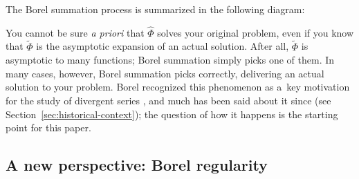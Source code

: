 \documentclass[10pt,a4paper]{amsart}
\newcommand{\series}[1]{\tilde{#1}}
\newcommand{\laplace}{\mathcal{L}}
\newcommand{\borel}{\mathcal{B}}
\newcommand{\aexp}{\text{\rm \ae}}
\numberwithin{equation}{section}
\begin{document}
The Borel summation process is summarized in the following diagram:
\begin{center}
\end{center}

You cannot be sure {\em a priori} that $\hat{\Phi}$ solves your original problem, even if you know that $\series{\Phi}$ is the asymptotic expansion of an actual solution. After all, $\series{\Phi}$ is asymptotic to many functions; Borel summation simply picks one of them. In many cases, however, Borel summation picks correctly, delivering an actual solution to your problem. Borel recognized this phenomenon as a~key motivation for the study of divergent series \cite{borel-memoire,borel-lecons}, and much has been said about it since (see Section~\ref{sec:historical-context}); the question of how it happens is the starting point for this paper.

\subsection{A new perspective: Borel regularity}
\end{document}
